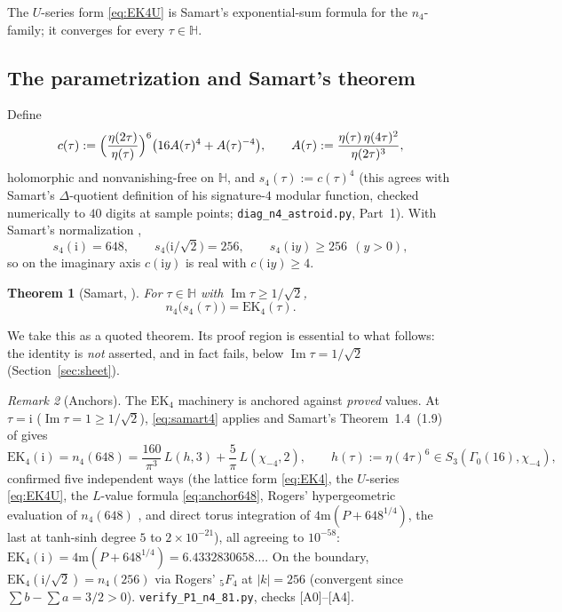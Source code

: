 \documentclass[11pt]{article}
\newtheorem{theorem}{Theorem}[section]
\theoremstyle{definition}
\theoremstyle{remark}
\newtheorem{remark}[theorem]{Remark}
\newcommand{\Hh}{\mathbb{H}}
\newcommand{\ii}{\mathrm{i}}
\newcommand{\ImT}{\operatorname{Im}}
\newcommand{\m}{\mathrm{m}}
\begin{document}
The $U$-series form \eqref{eq:EK4U} is Samart's exponential-sum formula
for the $n_4$-family; it converges for every $\tau\in\Hh$.

\subsection{The parametrization and Samart's theorem}

Define
\begin{equation}\label{eq:cdef}
  c(\tau):=\Bigl(\frac{\eta(2\tau)}{\eta(\tau)}\Bigr)^{6}
  \bigl(16A(\tau)^4+A(\tau)^{-4}\bigr),
  \qquad
  A(\tau):=\frac{\eta(\tau)\,\eta(4\tau)^2}{\eta(2\tau)^3},
\end{equation}
holomorphic and nonvanishing-free on $\Hh$, and
$s_4(\tau):=c(\tau)^4$ (this agrees with Samart's
$\Delta$-quotient definition of his signature-$4$ modular function,
checked numerically to $40$ digits at sample points;
\texttt{diag\_n4\_astroid.py}, Part~1). With Samart's normalization
\cite[Lemma~2.2]{Sa13},
\[
  s_4(\ii)=648,\qquad s_4\bigl(\ii/\sqrt2\bigr)=256,\qquad
  s_4(\ii y)\ge256\ \ (y>0),
\]
so on the imaginary axis $c(\ii y)$ is real with $c(\ii y)\ge4$.

\begin{theorem}[Samart, {\cite[Prop.~2.1(iii)]{Sa13}}]\label{thm:samart4}
For $\tau\in\Hh$ with $\ImT\tau\ge1/\sqrt2$,
\begin{equation}\label{eq:samart4}
  n_4\bigl(s_4(\tau)\bigr)=\mathrm{EK}_4(\tau).
\end{equation}
\end{theorem}

We take this as a quoted theorem. Its proof region is essential to what
follows: the identity is \emph{not} asserted, and in fact fails, below
$\ImT\tau=1/\sqrt2$ (Section~\ref{sec:sheet}).

\begin{remark}[Anchors]\label{rem:anchors}
The $\mathrm{EK}_4$ machinery is anchored against \emph{proved} values.
At $\tau=\ii$ ($\ImT\tau=1\ge1/\sqrt2$), \eqref{eq:samart4} applies and
Samart's Theorem~1.4~(1.9) of \cite{Sa13} gives
\begin{equation}\label{eq:anchor648}
  \mathrm{EK}_4(\ii)=n_4(648)
  =\frac{160}{\pi^3}\,L(h,3)+\frac5\pi\,L(\chi_{-4},2),
  \qquad h(\tau):=\eta(4\tau)^6\in S_3(\Gamma_0(16),\chi_{-4}),
\end{equation}
confirmed five independent ways (the lattice form \eqref{eq:EK4}, the
$U$-series \eqref{eq:EK4U}, the $L$-value formula \eqref{eq:anchor648},
Rogers' hypergeometric evaluation of $n_4(648)$ \cite{Sa13,Ro}, and
direct torus integration of $4\m(P+648^{1/4})$, the last at
tanh-sinh degree $5$ to $2\times10^{-21}$), all agreeing to
$10^{-58}$: $\mathrm{EK}_4(\ii)=4\m(P+648^{1/4})=6.4332830658\ldots$.
On the boundary, $\mathrm{EK}_4(\ii/\sqrt2)=n_4(256)$ via Rogers'
${}_5F_4$ at $|k|=256$ (convergent since $\sum b-\sum a=3/2>0$).
\texttt{verify\_P1\_n4\_81.py}, checks [A0]--[A4].
\end{remark}
\end{document}
